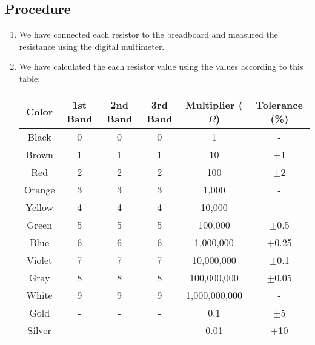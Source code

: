 \subsection{Procedure}
\begin{enumerate}
    \item We have connected each resistor to the breadboard and measured the resistance using the digital multimeter.
    \item We have calculated the each resistor value using the values according to this table:
    \begin{table}[h]
        \centering
        \begin{tabular}{|c|c|c|c|c|c|}
            \hline
            Color   & 1st Band & 2nd Band & 3rd Band & Multiplier (\(\Omega\)) & Tolerance (\%) \\ \hline
            Black   & 0        & 0        & 0        & 1                     & -              \\ \hline
            Brown   & 1        & 1        & 1        & 10                    & \(\pm\)1       \\ \hline
            Red     & 2        & 2        & 2        & 100                   & \(\pm\)2       \\ \hline
            Orange  & 3        & 3        & 3        & 1,000                 & -              \\ \hline
            Yellow  & 4        & 4        & 4        & 10,000                & -              \\ \hline
            Green   & 5        & 5        & 5        & 100,000               & \(\pm\)0.5     \\ \hline
            Blue    & 6        & 6        & 6        & 1,000,000             & \(\pm\)0.25    \\ \hline
            Violet  & 7        & 7        & 7        & 10,000,000            & \(\pm\)0.1     \\ \hline
            Gray    & 8        & 8        & 8        & 100,000,000           & \(\pm\)0.05    \\ \hline
            White   & 9        & 9        & 9        & 1,000,000,000         & -              \\ \hline
            Gold    & -        & -        & -        & 0.1                   & \(\pm\)5       \\ \hline
            Silver  & -        & -        & -        & 0.01                  & \(\pm\)10      \\ \hline
        \end{tabular}

\end{table}
\end{enumerate}
